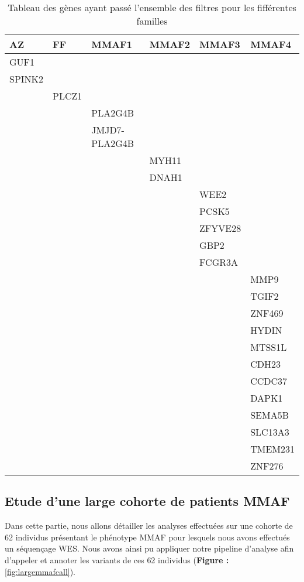 \documentclass[12pt,twoside]{reedthesis}
\theoremstyle{definition}
\theoremstyle{definition}
\theoremstyle{remark}
\begin{document}
  \begin{table}
  
  \caption{\label{tab:tablegene}Tableau des gènes ayant passé l'ensemble des filtres pour les fifférentes familles}
  \centering
  \begin{tabular}[t]{llllll}
  \toprule
  AZ & FF & MMAF1 & MMAF2 & MMAF3 & MMAF4\\
  \midrule
  GUF1 &  &  &  &  & \\
  SPINK2 &  &  &  &  & \\
   & PLCZ1 &  &  &  & \\
   &  & PLA2G4B &  &  & \\
   &  & JMJD7-PLA2G4B &  &  & \\
  \addlinespace
   &  &  & MYH11 &  & \\
   &  &  & DNAH1 &  & \\
   &  &  &  & WEE2 & \\
   &  &  &  & PCSK5 & \\
   &  &  &  & ZFYVE28 & \\
  \addlinespace
   &  &  &  & GBP2 & \\
   &  &  &  & FCGR3A & \\
   &  &  &  &  & MMP9\\
   &  &  &  &  & TGIF2\\
   &  &  &  &  & ZNF469\\
  \addlinespace
   &  &  &  &  & HYDIN\\
   &  &  &  &  & MTSS1L\\
   &  &  &  &  & CDH23\\
   &  &  &  &  & CCDC37\\
   &  &  &  &  & DAPK1\\
  \addlinespace
   &  &  &  &  & SEMA5B\\
   &  &  &  &  & SLC13A3\\
   &  &  &  &  & TMEM231\\
   &  &  &  &  & ZNF276\\
  \bottomrule
  \end{tabular}
  \end{table}
  
  \hypertarget{cohortemmah}{\subsection{Etude d'une large cohorte de
  patients MMAF}\label{cohortemmah}}
  
  Dans cette partie, nous allons détailler les analyses effectuées sur une
  cohorte de 62 individus présentant le phénotype MMAF pour lesquels nous
  avons effectués un séquençage WES. Nous avons ainsi pu appliquer notre
  pipeline d'analyse afin d'appeler et annoter les variants de ces 62
  individus (\textbf{Figure : }\ref{fig:largemmafcall}).
  
\end{document}
